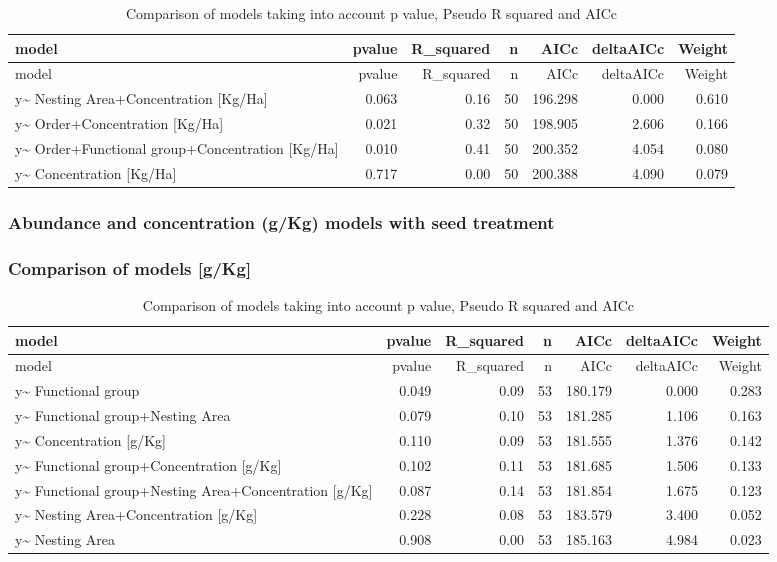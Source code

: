 \documentclass[]{elsarticle} %
\begin{document}
\begin{longtable}[c]{@{}lrrrrrr@{}}
\caption{Comparison of models taking into account p value, Pseudo R
squared and AICc}\tabularnewline
\toprule
model & pvalue & R\_squared & n & AICc & deltaAICc &
Weight\tabularnewline
\midrule
\endfirsthead
\toprule
model & pvalue & R\_squared & n & AICc & deltaAICc &
Weight\tabularnewline
\midrule
\endhead
y\textasciitilde{} Nesting Area+Concentration {[}Kg/Ha{]} & 0.063 & 0.16
& 50 & 196.298 & 0.000 & 0.610\tabularnewline
y\textasciitilde{} Order+Concentration {[}Kg/Ha{]} & 0.021 & 0.32 & 50 &
198.905 & 2.606 & 0.166\tabularnewline
y\textasciitilde{} Order+Functional group+Concentration {[}Kg/Ha{]} &
0.010 & 0.41 & 50 & 200.352 & 4.054 & 0.080\tabularnewline
y\textasciitilde{} Concentration {[}Kg/Ha{]} & 0.717 & 0.00 & 50 &
200.388 & 4.090 & 0.079\tabularnewline
\bottomrule
\end{longtable}

\subsubsection{Abundance and concentration (g/Kg) models with seed
treatment}\label{abundance-and-concentration-gkg-models-with-seed-treatment}

\subsubsection{Comparison of models
{[}g/Kg{]}}\label{comparison-of-models-gkg}

\begin{longtable}[c]{@{}lrrrrrr@{}}
\caption{Comparison of models taking into account p value, Pseudo R
squared and AICc}\tabularnewline
\toprule
model & pvalue & R\_squared & n & AICc & deltaAICc &
Weight\tabularnewline
\midrule
\endfirsthead
\toprule
model & pvalue & R\_squared & n & AICc & deltaAICc &
Weight\tabularnewline
\midrule
\endhead
y\textasciitilde{} Functional group & 0.049 & 0.09 & 53 & 180.179 &
0.000 & 0.283\tabularnewline
y\textasciitilde{} Functional group+Nesting Area & 0.079 & 0.10 & 53 &
181.285 & 1.106 & 0.163\tabularnewline
y\textasciitilde{} Concentration {[}g/Kg{]} & 0.110 & 0.09 & 53 &
181.555 & 1.376 & 0.142\tabularnewline
y\textasciitilde{} Functional group+Concentration {[}g/Kg{]} & 0.102 &
0.11 & 53 & 181.685 & 1.506 & 0.133\tabularnewline
y\textasciitilde{} Functional group+Nesting Area+Concentration
{[}g/Kg{]} & 0.087 & 0.14 & 53 & 181.854 & 1.675 & 0.123\tabularnewline
y\textasciitilde{} Nesting Area+Concentration {[}g/Kg{]} & 0.228 & 0.08
& 53 & 183.579 & 3.400 & 0.052\tabularnewline
y\textasciitilde{} Nesting Area & 0.908 & 0.00 & 53 & 185.163 & 4.984 &
0.023\tabularnewline
\bottomrule
\end{longtable}
\end{document}
